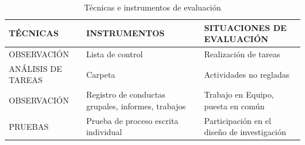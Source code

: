 \documentclass[../main]{subfiles}
\begin{document}
\begin{table}[h!]
    \centering
    \begin{tabular}{|l|p{5cm}|p{5cm}|} \hline
        TÉCNICAS & INSTRUMENTOS & SITUACIONES DE EVALUACIÓN \\ \hline \hline
        OBSERVACIÓN & Lista de control & Realización de tareas\\ \hline
        ANÁLISIS DE TAREAS & Carpeta & Actividades no regladas\\ \hline
        OBSERVACIÓN & Registro de conductas grupales, informes, trabajos & Trabajo en Equipo, puesta en común\\ \hline 
        PRUEBAS & Prueba de proceso escrita individual & Participación en el diseño de investigación\\ \hline
    \end{tabular}
    \caption{Técnicas e instrumentos de evaluación}
    
\end{table}
\end{document}
